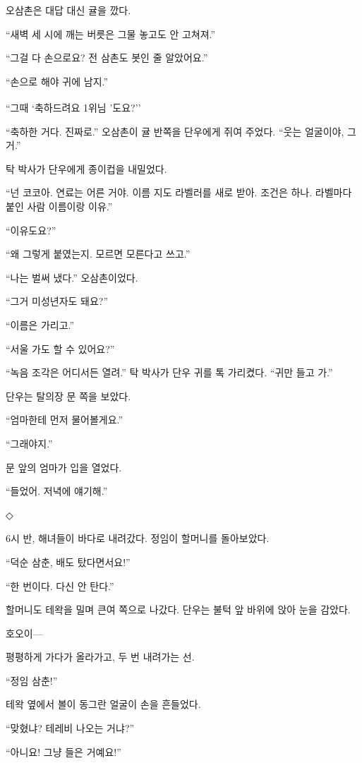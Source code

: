 \documentclass[
  korean,
  letterpaper,
  twoside,
  open=any,
  fontsize=12.5pt,
  headings=small]{scrbook}
\begin{document}
오삼촌은 대답 대신 귤을 깠다.

``새벽 세 시에 깨는 버릇은
그물 놓고도 안 고쳐져.''

``그걸 다 손으로요? 전 삼촌도
봇인 줄 알았어요.''

``손으로 해야 귀에 남지.''

``그때 `축하드려요 1위님
\textsuperscript{}'도요?''

``축하한 거다. 진짜로.''
오삼촌이 귤 반쪽을 단우에게
쥐여 주었다. ``웃는 얼굴이야,
그거.''

탁 박사가 단우에게 종이컵을
내밀었다.

``넌 코코아. 연료는 어른 거야.
이름 지도 라벨러를 새로 받아.
조건은 하나. 라벨마다 붙인
사람 이름이랑 이유.''

``이유도요?''

``왜 그렇게 붙였는지. 모르면
모른다고 쓰고.''

``나는 벌써 냈다.''
오삼촌이었다.

``그거 미성년자도 돼요?''

``이름은 가리고.''

``서울 가도 할 수 있어요?''

``녹음 조각은 어디서든 열려.''
탁 박사가 단우 귀를 톡
가리켰다. ``귀만 들고 가.''

단우는 탈의장 문 쪽을 보았다.

``엄마한테 먼저 물어볼게요.''

``그래야지.''

문 앞의 엄마가 입을 열었다.

``들었어. 저녁에 얘기해.''

\begin{center}◇\end{center}\nopagebreak

6시 반, 해녀들이 바다로
내려갔다. 정임이 할머니를
돌아보았다.

``덕순 삼춘, 배도
탔다면서요!''

``한 번이다. 다신 안 탄다.''

할머니도 테왁을 밀며 큰여
쪽으로 나갔다. 단우는 불턱 앞
바위에 앉아 눈을 감았다.

호오이---

평평하게 가다가 올라가고, 두
번 내려가는 선.

``정임 삼춘!''

테왁 옆에서 볼이 동그란 얼굴이
손을 흔들었다.

``맞혔냐? 테레비 나오는
거냐?''

``아니요! 그냥 들은 거예요!''
\end{document}
